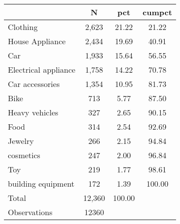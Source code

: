 {
\def\sym#1{\ifmmode^{#1}\else\(^{#1}\)\fi}
\begin{tabular}{l*{1}{ccc}}
\hline\hline
                    &           N&         pct&      cumpct\\
\hline
Clothing            &       2,623&       21.22&       21.22\\
House Appliance     &       2,434&       19.69&       40.91\\
Car                 &       1,933&       15.64&       56.55\\
Electrical appliance&       1,758&       14.22&       70.78\\
Car accessories     &       1,354&       10.95&       81.73\\
Bike                &         713&        5.77&       87.50\\
Heavy vehicles      &         327&        2.65&       90.15\\
Food                &         314&        2.54&       92.69\\
Jewelry             &         266&        2.15&       94.84\\
cosmetics           &         247&        2.00&       96.84\\
Toy                 &         219&        1.77&       98.61\\
building equipment  &         172&        1.39&      100.00\\
Total               &      12,360&      100.00&            \\
\hline
Observations        &       12360&            &            \\
\hline\hline
\end{tabular}
}

